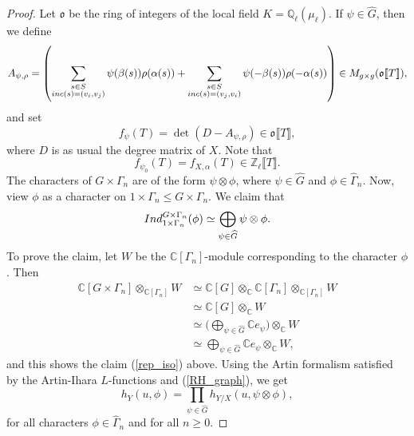\documentclass[11pt]{amsart}
\numberwithin{equation}{section}
\theoremstyle{remark}
\newcommand{\op}[1]{\operatorname{#1}}
\begin{document}
\begin{proof}
Let $\mathfrak{o}$ be the ring of integers of the local field $K = \mathbb{Q}_{\ell}(\mu_{\ell})$.  If $\psi \in \widehat{G}$, then we define
$$A_{\psi,\rho} =  \left(\sum_{\substack{s \in S \\ {\rm inc}(s) = (v_{i},v_{j})}}\psi(\beta(s))\rho(\alpha(s)) + \sum_{\substack{s \in S \\ {\rm inc}(s) = (v_{j},v_{i})}}\psi(-\beta(s))\rho(-\alpha(s)) \right) \in M_{g \times g}(\mathfrak{o}\llbracket T \rrbracket),$$
and set
$$f_{\psi}(T) = \op{det}(D - A_{\psi,\rho}) \in \mathfrak{o}\llbracket T \rrbracket, $$
where $D$ is as usual the degree matrix of $X$.  Note that
$$f_{\psi_{0}}(T) = f_{X,\alpha}(T) \in \mathbb{Z}_{\ell}\llbracket T \rrbracket. $$  
The characters of $G \times \Gamma_{n}$ are of the form $\psi \otimes \phi$, where $\psi \in \widehat{G}$ and $\phi \in \widehat{\Gamma}_{n}$.  Now, view $\phi$ as a character on $1 \times \Gamma_{n} \le G \times \Gamma_{n}$.  We claim that  
\begin{equation} \label{rep_iso}
{\rm Ind}_{1 \times \Gamma_{n}}^{G \times \Gamma_{n}}(\phi) \simeq \bigoplus_{\psi \in \widehat{G}} \psi \otimes \phi.
\end{equation}
To prove the claim, let $W$ be the $\mathbb{C}[\Gamma_{n}]$-module corresponding to the character $\phi$.  Then
\begin{equation*}
\begin{aligned}
\mathbb{C}[G \times \Gamma_{n} ] \otimes_{\mathbb{C}[\Gamma_{n}]}W &\simeq \mathbb{C}[G] \otimes_{\mathbb{C}} \mathbb{C}[ \Gamma_{n}] \otimes_{\mathbb{C}[ \Gamma_{n}]} W \\
&\simeq \mathbb{C}[G] \otimes_{\mathbb{C}}W \\
&\simeq \Big(\bigoplus_{\psi \in \widehat{G}} \mathbb{C}e_{\psi}\Big) \otimes_{\mathbb{C}} W \\
&\simeq \bigoplus_{\psi \in \widehat{G}} \mathbb{C}e_{\psi} \otimes_{\mathbb{C}}W,
\end{aligned}
\end{equation*}
and this shows the claim (\ref{rep_iso}) above.  Using the Artin formalism satisfied by the Artin-Ihara $L$-functions \cite[Proposition 3]{Stark/Terras:2000} and (\ref{RH_graph}), we get
\begin{equation} \label{useful_prod}
h_{Y}(u,\phi) = \prod_{\psi \in \widehat{G}}h_{Y/X}(u,\psi \otimes \phi),
\end{equation}
for all characters $\phi \in \widehat{\Gamma}_{n}$ and for all $n \ge 0$.  


\end{proof}
\end{document}

